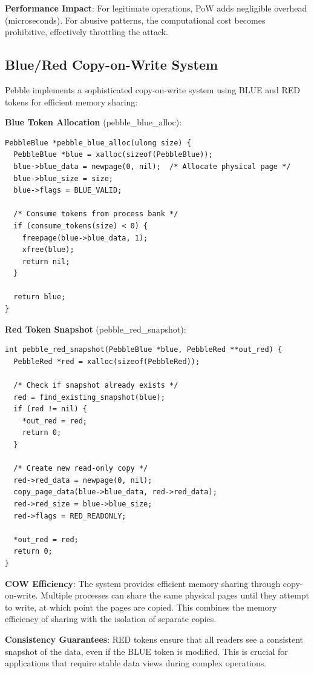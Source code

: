 \documentclass[11pt,letterpaper]{article}
\begin{document}
\textbf{Performance Impact}: For legitimate operations, PoW adds negligible overhead (microseconds). For abusive patterns, the computational cost becomes prohibitive, effectively throttling the attack.

\subsection{Blue/Red Copy-on-Write System}

Pebble implements a sophisticated copy-on-write system using BLUE and RED tokens for efficient memory sharing:

\textbf{Blue Token Allocation} (pebble\_blue\_alloc):

\begin{lstlisting}
PebbleBlue *pebble_blue_alloc(ulong size) {
  PebbleBlue *blue = xalloc(sizeof(PebbleBlue));
  blue->blue_data = newpage(0, nil);  /* Allocate physical page */
  blue->blue_size = size;
  blue->flags = BLUE_VALID;
  
  /* Consume tokens from process bank */
  if (consume_tokens(size) < 0) {
    freepage(blue->blue_data, 1);
    xfree(blue);
    return nil;
  }
  
  return blue;
}
\end{lstlisting}

\textbf{Red Token Snapshot} (pebble\_red\_snapshot):

\begin{lstlisting}
int pebble_red_snapshot(PebbleBlue *blue, PebbleRed **out_red) {
  PebbleRed *red = xalloc(sizeof(PebbleRed));
  
  /* Check if snapshot already exists */
  red = find_existing_snapshot(blue);
  if (red != nil) {
    *out_red = red;
    return 0;
  }
  
  /* Create new read-only copy */
  red->red_data = newpage(0, nil);
  copy_page_data(blue->blue_data, red->red_data);
  red->red_size = blue->blue_size;
  red->flags = RED_READONLY;
  
  *out_red = red;
  return 0;
}
\end{lstlisting}

\textbf{COW Efficiency}: The system provides efficient memory sharing through copy-on-write. Multiple processes can share the same physical pages until they attempt to write, at which point the pages are copied. This combines the memory efficiency of sharing with the isolation of separate copies.

\textbf{Consistency Guarantees}: RED tokens ensure that all readers see a consistent snapshot of the data, even if the BLUE token is modified. This is crucial for applications that require stable data views during complex operations.
\end{document}

